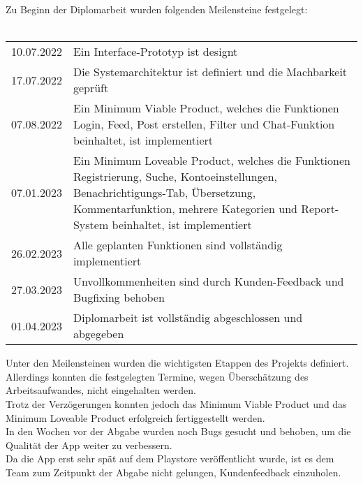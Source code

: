 Zu Beginn der Diplomarbeit wurden folgenden Meilensteine festgelegt:
\\\\
\begin{tabular}{|c|p{10cm}|}
    \hline
    10.07.2022 & Ein Interface-Prototyp ist designt                                                                                                                                                                                       \\
    17.07.2022 & Die Systemarchitektur ist definiert und die Machbarkeit geprüft                                                                                                                                                          \\
    07.08.2022 & Ein Minimum Viable Product, welches die Funktionen Login, Feed, Post erstellen, Filter und Chat-Funktion beinhaltet, ist implementiert                                                                                   \\
    07.01.2023 & Ein Minimum Loveable Product, welches die Funktionen Registrierung, Suche, Kontoeinstellungen, Benachrichtigungs-Tab, Übersetzung, Kommentarfunktion, mehrere Kategorien und Report-System beinhaltet, ist implementiert \\
    26.02.2023 & Alle geplanten Funktionen sind vollständig implementiert                                                                                                                                                                 \\
    27.03.2023 & Unvollkommenheiten sind durch Kunden-Feedback und Bugfixing behoben                                                                                                                                                      \\
    01.04.2023 & Diplomarbeit ist vollständig abgeschlossen und abgegeben                                                                                                                                                                 \\
    \hline
\end{tabular}

Unter den Meilensteinen wurden die wichtigsten Etappen des Projekts definiert. Allerdings konnten die festgelegten Termine, wegen Überschätzung des Arbeitsaufwandes, nicht eingehalten werden.
\\
Trotz der Verzögerungen konnten jedoch das Minimum Viable Product und das Minimum Loveable Product erfolgreich fertiggestellt werden.
\\
In den Wochen vor der Abgabe wurden noch Bugs gesucht und behoben, um die Qualität der App weiter zu verbessern.
\\
Da die App erst sehr spät auf dem Playstore veröffentlicht wurde, ist es dem Team zum Zeitpunkt der Abgabe nicht gelungen, Kundenfeedback einzuholen.


